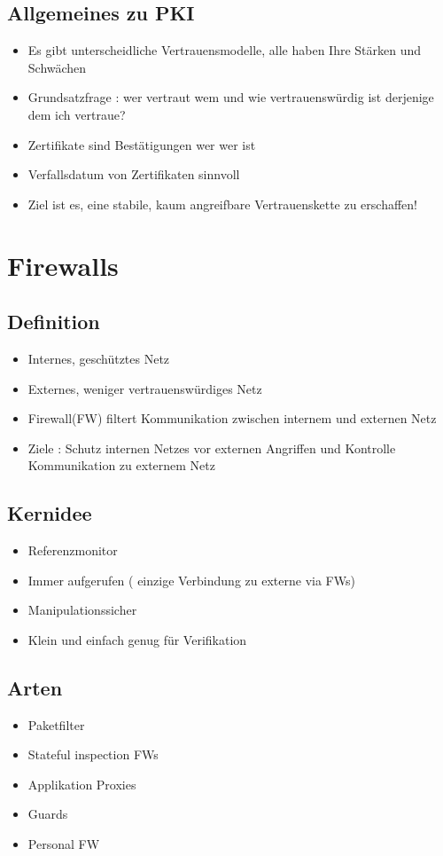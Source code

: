 {\subsection*{Allgemeines zu PKI}
\begin{itemize}
\item Es gibt unterscheidliche Vertrauensmodelle, alle haben Ihre Stärken und Schwächen
\item Grundsatzfrage : wer vertraut wem und wie vertrauenswürdig ist derjenige dem ich vertraue?
\item Zertifikate sind Bestätigungen wer wer ist
\item Verfallsdatum von Zertifikaten sinnvoll
\item Ziel ist es, eine stabile, kaum angreifbare Vertrauenskette zu erschaffen!
\end{itemize}

\section*{Firewalls}

\subsection*{ Definition }
\begin{itemize}
	\item Internes, geschütztes Netz
	\item Externes, weniger vertrauenswürdiges Netz
	\item Firewall(FW) filtert Kommunikation zwischen internem und externen Netz
	\item Ziele : Schutz internen Netzes vor externen Angriffen und Kontrolle Kommunikation zu externem Netz
\end{itemize}

\subsection*{ Kernidee }
\begin{itemize}
	\item Referenzmonitor
	\item Immer aufgerufen ( einzige Verbindung zu externe via FWs)
	\item Manipulationssicher
	\item Klein und einfach genug für Verifikation
\end{itemize}

\subsection*{ Arten }
\begin{itemize}
	\item Paketfilter
	\item Stateful inspection FWs
	\item Applikation Proxies
	\item Guards
	\item Personal FW
\end{itemize}

}
